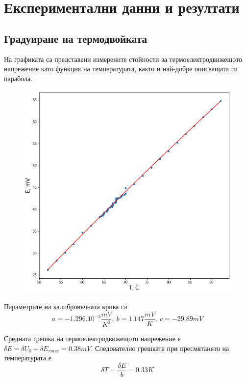 \documentclass[aps, prb, twocolumn, a4paper, floatfix, reprint]{revtex4-2}
\begin{document}
\section{Експериментални данни и резултати}
\subsection{Градуиране на термодвойката}
На графиката са представени измерените стойности за термоелектродвижещото напрежение като функция на температурата, както и най-добре описващата ги парабола. 

\begin{figure}[H]
    \centering
    \includegraphics[width=0.9\columnwidth, keepaspectratio=true]{graduirane.png}
\end{figure}

Параметрите на калибровъчната крива са 
\begin{equation*}
    a = -1.296.10^{-3} \frac{mV}{K^2}, \ b = 1.147 \frac{mV}{K}, \ c = -29.89 mV
\end{equation*}

Средната грешка на термоелектродвижещото напрежение е $\delta E = \delta U_0 + \delta E_{rmse} = 0.38 mV$. Следователно грешката при пресмятането на температурата е 
\begin{equation*}
    \delta T = \frac{\delta E}{b} = 0.33 K
\end{equation*}
\end{document}
